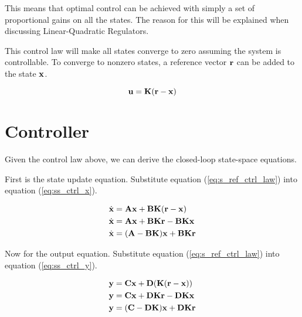 This means that optimal control can be achieved with simply a set of
proportional gains on all the states. The reason for this will be explained when
discussing Linear-Quadratic Regulators.

This \gls{control law} will make all states converge to zero assuming the system
is controllable. To converge to nonzero states, a reference vector $\mathbf{r}$ can
be added to the state $\mathbf{x}$.

\begin{theorem}
  \begin{equation}
    \mathbf{u} = \mathbf{K}(\mathbf{r} - \mathbf{x}) \label{eq:s_ref_ctrl_law}
  \end{equation}
\end{theorem}

\section{Controller}

Given the \gls{control law} above, we can derive the closed-loop state-space
equations.

First is the state update equation. Substitute equation
(\ref{eq:s_ref_ctrl_law}) into equation (\ref{eq:ss_ctrl_x}).

\begin{align}
  \dot{\mathbf{x}} &= \mathbf{A}\mathbf{x} + \mathbf{B}\mathbf{K}(\mathbf{r} - \mathbf{x}) \nonumber
    \\
  \dot{\mathbf{x}} &= \mathbf{A}\mathbf{x} + \mathbf{B}\mathbf{K}\mathbf{r} -
    \mathbf{B}\mathbf{K}\mathbf{x} \nonumber \\
  \dot{\mathbf{x}} &= (\mathbf{A} - \mathbf{B}\mathbf{K})\mathbf{x} + \mathbf{B}\mathbf{K}\mathbf{r}
\end{align}

Now for the output equation. Substitute equation (\ref{eq:s_ref_ctrl_law}) into
equation (\ref{eq:ss_ctrl_y}).

\begin{align}
  \mathbf{y} &= \mathbf{C}\mathbf{x} + \mathbf{D}(\mathbf{K}(\mathbf{r} - \mathbf{x})) \nonumber \\
  \mathbf{y} &= \mathbf{C}\mathbf{x} + \mathbf{D}\mathbf{K}\mathbf{r} - \mathbf{D}\mathbf{K}\mathbf{x}
    \nonumber \\
  \mathbf{y} &= (\mathbf{C} - \mathbf{D}\mathbf{K})\mathbf{x} + \mathbf{D}\mathbf{K}\mathbf{r}
\end{align}


